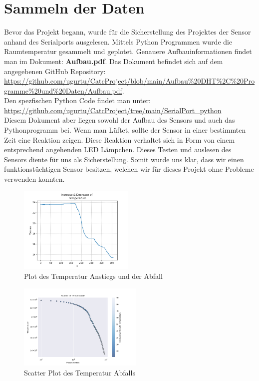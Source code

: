 \documentclass{article}
\begin{document}
\section{Sammeln der Daten}
Bevor das Projekt begann, wurde für die Sicherstellung des Projektes der Sensor anhand des Serialports ausgelesen. Mittels Python Programmen wurde die Raumtemperatur gesammelt und geplotet. Genauere Aufbauinformationen findet man im Dokument:\textbf{ Aufbau.pdf}. Das Dokument befindet sich auf dem angegebenen GitHub Repository: \url{https://github.com/ugurtu/CatcProject/blob/main/Aufbau\%20DHT\%2C\%20Programme\%20und\%20Daten/Aufbau.pdf}.\\ Den spezfischen Python Code findet man unter: \url{https://github.com/ugurtu/CatcProject/tree/main/SerialPort_python}
\\ Diesem Dokument aber liegen sowohl der Aufbau des Sensors und auch das Pythonprogramm bei. Wenn man Lüftet, sollte der Sensor in einer bestimmten Zeit eine Reaktion zeigen. Diese Reaktion verhaltet sich in Form von einem entsprechend angehenden LED Lämpchen. Dieses Testen und auslesen des Sensors diente für uns als Sicherstellung. Somit wurde uns klar, dass wir einen funktionstüchtigen Sensor besitzen, welchen wir für dieses Projekt ohne Probleme verwenden konnten.
\begin{figure}[!h]
\begin{center}
\includegraphics[width=0.49\textwidth]{plot.png}
\caption{Plot des Temperatur Anstiegs und der Abfall}
\label{fig:decrease}
\end{center}
\end{figure}
\begin{figure}[!h]
\begin{center}
\includegraphics[width=0.53\textwidth]{scatter.png}
\caption{Scatter Plot des Temperatur Abfalls}
\label{fig:scatter}
\end{center}
\end{figure}
\end{document}

